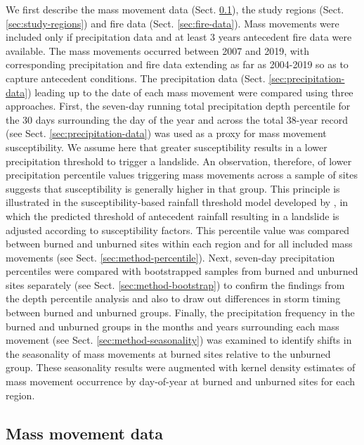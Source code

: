 \documentclass[nhess, manuscript]{copernicus}
\begin{document}
We first describe the mass movement data (Sect. \ref{sec:landslide-data}), the study regions 
(Sect. \ref{sec:study-regions}) and 
fire data (Sect. \ref{sec:fire-data}). Mass movements were included only if precipitation data and at least 3 years antecedent fire data were available. The mass movements occurred between 2007 and 2019, with corresponding precipitation and fire data extending as far as 2004-2019 so as to capture antecedent conditions. The precipitation data 
(Sect. \ref{sec:precipitation-data}) leading up to the date of each mass movement were 
compared using three approaches.  First, the seven-day running total precipitation depth percentile for the 30 days surrounding the day of the year and across the total 38-year record  (see Sect. \ref{sec:precipitation-data})
was used as a proxy for mass movement
susceptibility. We assume here that greater susceptibility results in a lower precipitation threshold to trigger a landslide. An observation, therefore, of lower precipitation percentile values triggering mass movements across a sample of sites suggests that susceptibility is generally higher in that group. This principle is illustrated in the susceptibility-based rainfall threshold model developed by \citep{monsieurs2019susceptibility}, in which the predicted threshold of antecedent rainfall resulting in a landslide is adjusted according to susceptibility factors. This percentile value was compared between burned and
unburned sites within each region and for all included mass movements (see Sect. \ref{sec:method-percentile}). Next,
seven-day precipitation percentiles were compared with bootstrapped
samples from burned and unburned sites separately (see Sect. \ref{sec:method-bootstrap}) to
confirm the findings from the depth percentile analysis and also to draw out
differences in storm timing between burned and unburned groups. Finally,
the precipitation frequency in the burned and unburned groups in the
months and years surrounding each mass movement (see Sect. \ref{sec:method-seasonality}) was examined
to identify shifts in the seasonality of mass movements at burned sites
relative to the unburned group. These seasonality results were augmented
with kernel density estimates of mass movement occurrence by day-of-year at
burned and unburned sites for each region.

\subsection{Mass movement data}\label{sec:landslide-data}
\end{document}
